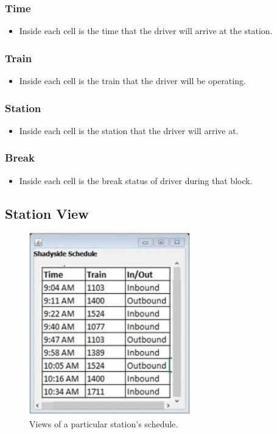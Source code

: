 \documentclass[letterpaper]{article}
\begin{document}
\subsubsection{Time}
\begin{itemize}
	\item Inside each cell is the time that the driver will arrive at the station.
\end{itemize}

\subsubsection{Train}
\begin{itemize}
	\item Inside each cell is the train that the driver will be operating.
\end{itemize}

\subsubsection{Station}
\begin{itemize}
	\item Inside each cell is the station that the driver will arrive at.
\end{itemize}

\subsubsection{Break}
\begin{itemize}
	\item Inside each cell is the break status of driver during that block.
\end{itemize}


\subsection{Station View}

\begin{figure}[h!]
	\center
	\includegraphics[width=7cm]{station_view}
	\caption{Views of a particular station's schedule.}
\end{figure}
\end{document}

